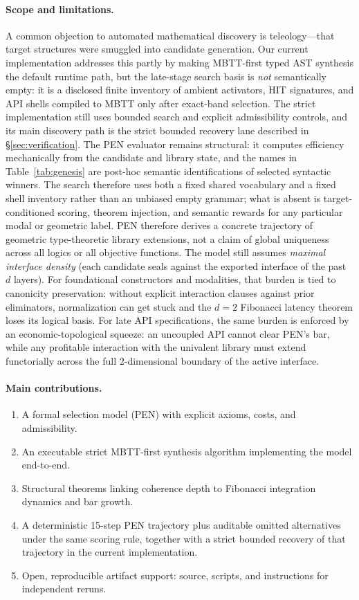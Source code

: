 \documentclass[11pt,a4paper]{article}
\theoremstyle{plain}
\theoremstyle{definition}
\theoremstyle{remark}
\begin{document}
\paragraph{Scope and limitations.}
A common objection to automated mathematical discovery is teleology---that target structures were smuggled into candidate generation.
Our current implementation addresses this partly by making MBTT-first typed AST synthesis the default runtime path, but the late-stage search basis is \emph{not} semantically empty: it is a disclosed finite inventory of ambient activators, HIT signatures, and API shells compiled to MBTT only after exact-band selection.
The strict implementation still uses bounded search and explicit admissibility controls, and its main discovery path is the strict bounded recovery lane described in \S\ref{sec:verification}.
The PEN evaluator remains structural: it computes efficiency mechanically from the candidate and library state, and the names in Table~\ref{tab:genesis} are post-hoc semantic identifications of selected syntactic winners.
The search therefore uses both a fixed shared vocabulary and a fixed shell inventory rather than an unbiased empty grammar; what is absent is target-conditioned scoring, theorem injection, and semantic rewards for any particular modal or geometric label.
PEN therefore derives a concrete trajectory of geometric type-theoretic library extensions, not a claim of global uniqueness across all logics or all objective functions.
The model still assumes \emph{maximal interface density} (each candidate seals against the exported interface of the past $d$ layers).
For foundational constructors and modalities, that burden is tied to canonicity preservation: without explicit interaction clauses against prior eliminators, normalization can get stuck and the $d=2$ Fibonacci latency theorem loses its logical basis.
For late API specifications, the same burden is enforced by an economic-topological squeeze: an uncoupled API cannot clear PEN's bar, while any profitable interaction with the univalent library must extend functorially across the full $2$-dimensional boundary of the active interface.

\paragraph{Main contributions.}
\begin{enumerate}[nosep]
    \item A formal selection model (PEN) with explicit axioms, costs, and admissibility.
    \item An executable strict MBTT-first synthesis algorithm implementing the model end-to-end.
    \item Structural theorems linking coherence depth to Fibonacci integration dynamics and bar growth.
    \item A deterministic 15-step PEN trajectory plus auditable omitted alternatives under the same scoring rule, together with a strict bounded recovery of that trajectory in the current implementation.
    \item Open, reproducible artifact support: source, scripts, and instructions for independent reruns.
\end{enumerate}
\end{document}

